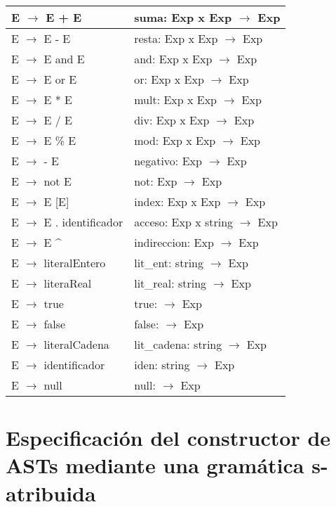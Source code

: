 \documentclass[11pt]{article}
\begin{document}
\begin{center}
\begin{longtable}{|p{7cm}|p{7cm}|}
        \hline
        E $\rightarrow$ E + E & suma: Exp x Exp $\rightarrow$ Exp \\
        \hline
        E $\rightarrow$ E - E & resta: Exp x Exp $\rightarrow$ Exp \\
        \hline
        E $\rightarrow$ E and E & and: Exp x Exp $\rightarrow$ Exp \\
        \hline
        E $\rightarrow$ E or E & or: Exp x Exp $\rightarrow$ Exp \\
        \hline
        E $\rightarrow$ E * E & mult: Exp x Exp $\rightarrow$ Exp \\
        \hline
        E $\rightarrow$ E / E & div: Exp x Exp $\rightarrow$ Exp \\
        \hline
        E $\rightarrow$ E \% E & mod: Exp x Exp $\rightarrow$ Exp \\
        \hline
        E $\rightarrow$ - E & negativo: Exp $\rightarrow$ Exp \\
        \hline
        E $\rightarrow$ not E & not: Exp $\rightarrow$ Exp \\
        \hline
        E $\rightarrow$ E [E] & index: Exp x Exp $\rightarrow$ Exp \\
        \hline
        E $\rightarrow$ E . identificador & acceso: Exp x string $\rightarrow$ Exp \\
        \hline
        E $\rightarrow$ E \^{} & indireccion: Exp $\rightarrow$ Exp \\
        \hline
        E $\rightarrow$ literalEntero & lit\_ent: string $\rightarrow$ Exp \\
        \hline
        E $\rightarrow$ literaReal & lit\_real: string $\rightarrow$ Exp \\
        \hline
        E $\rightarrow$ true & true: $\rightarrow$ Exp \\
        \hline
        E $\rightarrow$ false & false: $\rightarrow$ Exp \\
        \hline
        E $\rightarrow$ literalCadena & lit\_cadena: string $\rightarrow$ Exp \\
        \hline
        E $\rightarrow$ identificador & iden: string $\rightarrow$ Exp \\
        \hline
        E $\rightarrow$ null & null: $\rightarrow$ Exp \\
        \hline
    \end{longtable}
    \end{center}

    \section{Especificación del constructor de ASTs mediante una gramática s-atribuida}
\end{document}
